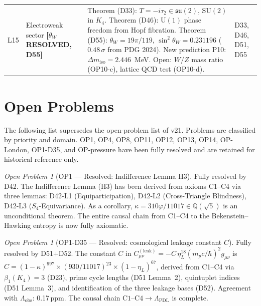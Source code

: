\documentclass[11pt,a4paper]{article}
\theoremstyle{plain}
\theoremstyle{definition}
\theoremstyle{remark}
\newtheorem{openproblem}[theorem]{Open Problem}
\begin{document}
\begin{longtable}{L{0.6cm}L{3.0cm}L{5.5cm}L{4.0cm}}
L15 & Electroweak sector \textbf{[$\theta_W$ RESOLVED, D55]} & \textcolor{proofblue}{Theorem} (D33): $T=-i\tau_2\in\mathfrak{su}(2)$, $\mathrm{SU}(2)$ in $K_4$. \textcolor{proofblue}{Theorem} (D46): $\mathrm{U}(1)$ phase freedom from Hopf fibration. \textcolor{proofblue}{Theorem} (D55): $\theta_W = 19\pi/119$, $\sin^2\theta_W = 0.231196$ ($0.48\,\sigma$ from PDG 2024). New prediction P10: $\Delta m_{\mathrm{iso}} = 2.446$~MeV. Open: $W/Z$ mass ratio (OP10-c), lattice QCD test (OP10-d). & D33, D46, D51, D55\\[0.3em]
\end{longtable}

\section{Open Problems}
\label{sec:openproblems}

The following list supersedes the open-problem list of v21. Problems are classified by priority and domain. OP1, OP4, OP8, OP11, OP12, OP13, OP14, OP-London, OP1-D35, and OP-pressure have been fully resolved and are retained for historical reference only.

\begin{openproblem}[OP1 --- Resolved: Indifference Lemma H3]
\label{op:H3}
\textcolor{proofblue}{Fully resolved by D42.} The Indifference Lemma (H3) has been derived from axioms C1--C4 via three lemmas: D42-L1 (Equiparticipation), D42-L2 (Cross-Triangle Blindness), D42-L3 ($S_4$-Equivariance). As a corollary, $\kappa=310\varphi/11017\in\mathbb{Q}(\sqrt{5})$ is an unconditional theorem. The entire causal chain from C1--C4 to the Bekenstein--Hawking entropy is now fully axiomatic.
\end{openproblem}

\begin{openproblem}[OP1-D35 --- Resolved: cosmological leakage constant $C$]
\label{op:leakconstant}
\textcolor{proofblue}{Fully resolved by D51+D52.} The constant $C$ in $C^{(\mathrm{leak})}_{\mu\nu}=-C\,\eta_L^{18}(m_p c/\hbar)^2 g_{\mu\nu}$ is $C=(1-\kappa)^{997}\times(930/11017)^{23}\times(1-\eta_L)^{67}$, derived from C1--C4 via $\beta_1(K_4)=3$ (D23), prime cycle lengths (D51 Lemma~2), quintuplet indices (D51 Lemma~3), and identification of the three leakage bases (D52). Agreement with $\Lambda_{\mathrm{obs}}$: 0.17\,ppm. The causal chain $\mathrm{C1\text{--}C4}\to\Lambda_{\mathrm{PDL}}$ is complete.
\end{openproblem}
\end{document}

